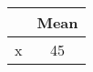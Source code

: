 {
\def\sym#1{\ifmmode^{#1}\else\(^{#1}\)\fi}
\begin{tabular}{l*{1}{c}}
\hline\hline
                    &        Mean\\
\hline
x                   &           45\\
\hline\hline
\end{tabular}
}
